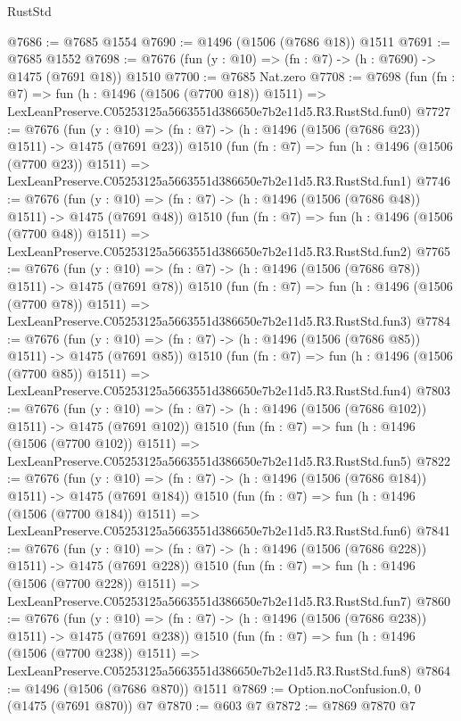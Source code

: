 \begin{lexlean}{RustStd}
\begin{coremodule}
@7686 := @7685 @1554
@7690 := @1496 (@1506 (@7686 @18)) @1511
@7691 := @7685 @1552
@7698 := @7676 (fun (y : @10) => (fn : @7) -> (h : @7690) -> @1475 (@7691 @18)) @1510
@7700 := @7685 Nat.zero
@7708 := @7698
    (fun (fn : @7) =>
    fun (h : @1496 (@1506 (@7700 @18)) @1511) =>
    LexLeanPreserve.C05253125a5663551d386650e7b2e11d5.R3.RustStd.fun0)
@7727 := @7676
    (fun (y : @10) => (fn : @7) -> (h : @1496 (@1506 (@7686 @23)) @1511) -> @1475 (@7691 @23))
    @1510
    (fun (fn : @7) =>
    fun (h : @1496 (@1506 (@7700 @23)) @1511) =>
    LexLeanPreserve.C05253125a5663551d386650e7b2e11d5.R3.RustStd.fun1)
@7746 := @7676
    (fun (y : @10) => (fn : @7) -> (h : @1496 (@1506 (@7686 @48)) @1511) -> @1475 (@7691 @48))
    @1510
    (fun (fn : @7) =>
    fun (h : @1496 (@1506 (@7700 @48)) @1511) =>
    LexLeanPreserve.C05253125a5663551d386650e7b2e11d5.R3.RustStd.fun2)
@7765 := @7676
    (fun (y : @10) => (fn : @7) -> (h : @1496 (@1506 (@7686 @78)) @1511) -> @1475 (@7691 @78))
    @1510
    (fun (fn : @7) =>
    fun (h : @1496 (@1506 (@7700 @78)) @1511) =>
    LexLeanPreserve.C05253125a5663551d386650e7b2e11d5.R3.RustStd.fun3)
@7784 := @7676
    (fun (y : @10) => (fn : @7) -> (h : @1496 (@1506 (@7686 @85)) @1511) -> @1475 (@7691 @85))
    @1510
    (fun (fn : @7) =>
    fun (h : @1496 (@1506 (@7700 @85)) @1511) =>
    LexLeanPreserve.C05253125a5663551d386650e7b2e11d5.R3.RustStd.fun4)
@7803 := @7676
    (fun (y : @10) => (fn : @7) -> (h : @1496 (@1506 (@7686 @102)) @1511) -> @1475 (@7691 @102))
    @1510
    (fun (fn : @7) =>
    fun (h : @1496 (@1506 (@7700 @102)) @1511) =>
    LexLeanPreserve.C05253125a5663551d386650e7b2e11d5.R3.RustStd.fun5)
@7822 := @7676
    (fun (y : @10) => (fn : @7) -> (h : @1496 (@1506 (@7686 @184)) @1511) -> @1475 (@7691 @184))
    @1510
    (fun (fn : @7) =>
    fun (h : @1496 (@1506 (@7700 @184)) @1511) =>
    LexLeanPreserve.C05253125a5663551d386650e7b2e11d5.R3.RustStd.fun6)
@7841 := @7676
    (fun (y : @10) => (fn : @7) -> (h : @1496 (@1506 (@7686 @228)) @1511) -> @1475 (@7691 @228))
    @1510
    (fun (fn : @7) =>
    fun (h : @1496 (@1506 (@7700 @228)) @1511) =>
    LexLeanPreserve.C05253125a5663551d386650e7b2e11d5.R3.RustStd.fun7)
@7860 := @7676
    (fun (y : @10) => (fn : @7) -> (h : @1496 (@1506 (@7686 @238)) @1511) -> @1475 (@7691 @238))
    @1510
    (fun (fn : @7) =>
    fun (h : @1496 (@1506 (@7700 @238)) @1511) =>
    LexLeanPreserve.C05253125a5663551d386650e7b2e11d5.R3.RustStd.fun8)
@7864 := @1496 (@1506 (@7686 @870)) @1511
@7869 := Option.noConfusion.{0, 0} (@1475 (@7691 @870)) @7
@7870 := @603 @7
@7872 := @7869 @7870 @7

\end{coremodule}
\end{lexlean}
